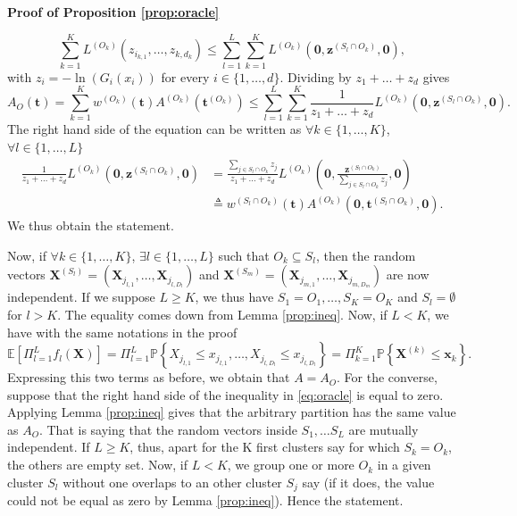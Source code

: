 \documentclass[11pt]{article}
\makeatletter
\renewenvironment{proof}[1][\proofname]{\par
\pushQED{\qed}%
\normalfont \topsep6\p@\@plus6\p@\relax
\trivlist
\item\relax
{\textbf{
#1\@addpunct{ }}}\hspace\labelsep\ignorespaces
}{%
\popQED\endtrivlist\@endpefalse
}
\makeatother
\begin{document}
\begin{proof}[Proof of Proposition \ref{prop:oracle}]
		\begin{equation*}
			\sum_{k=1}^K L^{(O_k)}(z_{i_{k,1}},\dots, z_{k,d_k}) \leq \sum_{l=1}^L \sum_{k=1}^K L^{(O_k)}(\textbf{0}, \textbf{z}^{(S_l \cap O_k)}, \textbf{0}),
		\end{equation*}
		with $z_i = -\ln (G_i(x_i))$ for every $i \in \{1, \dots, d\}$. Dividing by $z_1 + \dots + z_d$ gives
		\begin{equation*}
			A_{O} (\textbf{t}) = \sum_{k=1}^K w^{(O_k)}(\textbf{t}) A^{(O_k)}(\textbf{t}^{(O_k)}) \leq \sum_{l=1}^L \sum_{k=1}^K \frac{1}{z_1+\dots+z_d}L^{(O_k)}(\textbf{0}, \textbf{z}^{(S_l \cap O_k)}, \textbf{0}).
		\end{equation*}
		The right hand side of the equation can be written as $\forall k \in \{1,\dots, K\}$, $\forall l \in \{1,\dots, L\}$
		\begin{align*}
			\frac{1}{z_1 + \dots + z_d} L^{(O_k)}(\textbf{0}, \textbf{z}^{(S_l \cap O_k)}, \textbf{0}) &= \frac{\sum_{j \in S_l \cap O_k} z_j}{z_1 + \dots + z_d} L^{(O_k)}\left(\textbf{0}, \frac{\textbf{z}^{(S_l \cap O_k)}}{\sum_{j \in S_l \cap O_k} z_j}, \textbf{0}\right) \\
			&\triangleq w^{(S_l \cap O_k)}(\textbf{t}) A^{(O_k)}(\textbf{0}, \textbf{t}^{(S_l \cap O_k)}, \textbf{0}).
		\end{align*}
		We thus obtain the statement.
		
		
		Now, if $\forall k \in \{1,\dots, K\}$, $\exists l \in \{1, \dots, L\}$ such that $O_k \subseteq S_l$, then the random vectors $\textbf{X}^{(S_l)} = (\textbf{X}_{j_{l,1}}, \dots, \textbf{X}_{j_{l,D_l}})$ and $\textbf{X}^{(S_m)} = (\textbf{X}_{j_{m,1}}, \dots, \textbf{X}_{j_{m,D_m}})$ are now independent. If we suppose $L \geq K$, we thus have $S_1 = O_1, \dots, S_K = O_K$ and $S_{l} = \emptyset$ for $l > K$. The equality comes down from Lemma \ref{prop:ineq}. Now, if $L < K$, we have with the same notations in the proof
		\begin{equation*}
			\mathbb{E}\left[ \Pi_{l=1}^L f_l(\textbf{X}) \right] = \Pi_{l=1}^L \mathbb{P}\left\{ X_{j_{l,1}} \leq x_{j_{l,1}}, \dots, X_{j_{l,D_l}} \leq x_{j_{l,D_l}}\right\} = \Pi_{k=1}^K \mathbb{P}\left\{ \textbf{X}^{(k)} \leq \textbf{x}_k \right\}.
		\end{equation*}
		Expressing this two terms as before, we obtain that $A = A_{O}$. For the converse, suppose that the right hand side of the inequality in \eqref{eq:oracle} is equal to zero. Applying Lemma \ref{prop:ineq} gives that the arbitrary partition has the same value as $A_{O}$. That is saying that the random vectors inside $S_1, \dots S_L$ are mutually independent. If $L \geq K$, thus, apart for the K first clusters say for which $S_k = O_k$, the others are empty set. Now, if $L < K$, we group one or more $O_k$ in a given cluster $S_l$ without one overlaps to an other cluster $S_j$ say (if it does, the value could not be equal as zero by Lemma \ref{prop:ineq}). Hence the statement.
	\end{proof}
	
\end{document}
